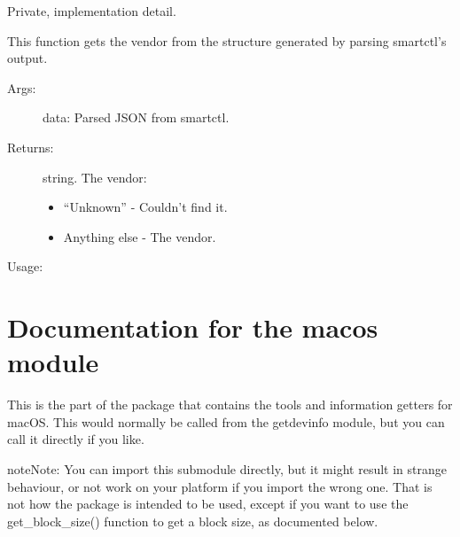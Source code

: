 \documentclass[letterpaper,10pt,english]{sphinxmanual}
\begin{document}
\begin{fulllineitems}
\label{\detokenize{cygwin:getdevinfo.cygwin.get_vendor}}
Private, implementation detail.

This function gets the vendor from the structure generated
by parsing smartctl’s output.
\begin{description}
\item[{Args:}] \leavevmode
data:   Parsed JSON from smartctl.

\item[{Returns:}] \leavevmode
string. The vendor:
\begin{itemize}
\item {} 
“Unknown”     - Couldn’t find it.

\item {} 
Anything else - The vendor.

\end{itemize}

\end{description}

Usage:

\begin{sphinxVerbatim}[commandchars=\\\{\}]
  
\end{sphinxVerbatim}

\end{fulllineitems}



\chapter{Documentation for the macos module}
\label{\detokenize{macos:module-getdevinfo.macos}}\label{\detokenize{macos:documentation-for-the-macos-module}}\label{\detokenize{macos::doc}}
This is the part of the package that contains the tools and information
getters for macOS. This would normally be called from the getdevinfo
module, but you can call it directly if you like.

\begin{sphinxadmonition}{note}{Note:}
You can import this submodule directly, but it might result
in strange behaviour, or not work on your platform if you
import the wrong one. That is not how the package is intended
to be used, except if you want to use the get\_block\_size()
function to get a block size, as documented below.
\end{sphinxadmonition}
\end{document}
